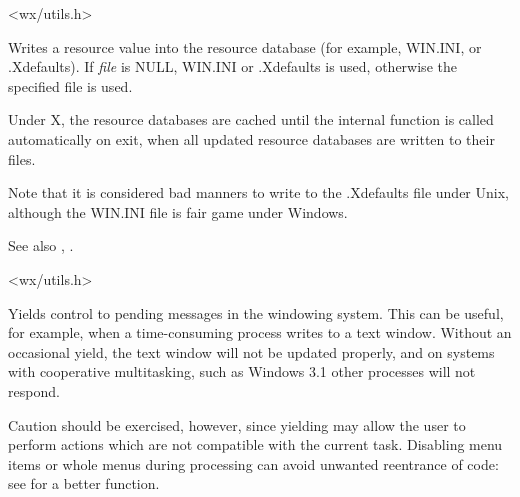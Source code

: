 
<wx/utils.h>

\label{wxwriteresource}





Writes a resource value into the resource database (for example, WIN.INI, or
.Xdefaults). If {\it file} is NULL, WIN.INI or .Xdefaults is used,
otherwise the specified file is used.

Under X, the resource databases are cached until the internal function
 is called automatically on exit, when
all updated resource databases are written to their files.

Note that it is considered bad manners to write to the .Xdefaults
file under Unix, although the WIN.INI file is fair game under Windows.

See also , .


<wx/utils.h>

\label{wxyield}


Yields control to pending messages in the windowing system. This can be useful, for example, when a
time-consuming process writes to a text window. Without an occasional
yield, the text window will not be updated properly, and on systems with
cooperative multitasking, such as Windows 3.1 other processes will not respond.

Caution should be exercised, however, since yielding may allow the
user to perform actions which are not compatible with the current task.
Disabling menu items or whole menus during processing can avoid unwanted
reentrance of code: see  for a better
function.

